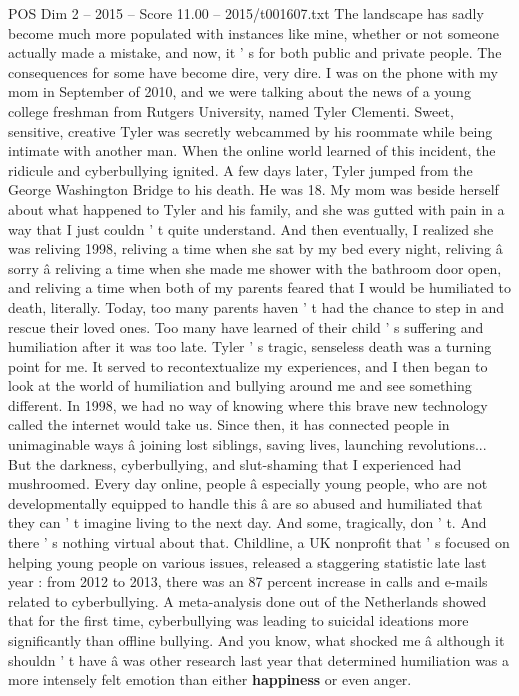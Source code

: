 \begin{textsample}{POS Dim 2 – 2015 – Score 11.00 – 2015/t001607.txt}
The landscape has sadly become much more populated with instances like mine, whether or not someone actually made a mistake, and now, it ' s for both public and private people.
The consequences for some have become dire, very dire.
I was on the phone with my mom in September of 2010, and we were talking about the news of a young college freshman from Rutgers University, named Tyler Clementi.
Sweet, sensitive, creative Tyler was secretly webcammed by his roommate while being intimate with another man.
When the online world learned of this incident, the ridicule and cyberbullying ignited.
A few days later, Tyler jumped from the George Washington Bridge to his death.
He was 18.
My mom was beside herself about what happened to Tyler and his family, and she was gutted with pain in a way that I just couldn ' t quite understand.
And then eventually, I realized she was reliving 1998, reliving a time when she sat by my bed every night, reliving â sorry â reliving a time when she made me shower with the bathroom door open, and reliving a time when both of my parents feared that I would be humiliated to death, literally.
Today, too many parents haven ' t had the chance to step in and rescue their loved ones.
Too many have learned of their child ' s suffering and humiliation after it was too late.
Tyler ' s tragic, senseless death was a turning point for me.
It served to recontextualize my experiences, and I then began to look at the world of humiliation and bullying around me and see something different.
In 1998, we had no way of knowing where this brave new technology called the internet would take us.
Since then, it has connected people in unimaginable ways â joining lost siblings, saving lives, launching revolutions...
But the darkness, cyberbullying, and slut-shaming that I experienced had mushroomed.
Every day online, people â especially young people, who are not developmentally equipped to handle this â are so abused and humiliated that they can ' t imagine living to the next day.
And some, tragically, don ' t.
And there ' s nothing virtual about that.
Childline, a UK nonprofit that ' s focused on helping young people on various issues, released a staggering statistic late last year : from 2012 to 2013, there was an 87 percent increase in calls and e-mails related to cyberbullying.
A meta-analysis done out of the Netherlands showed that for the first time, cyberbullying was leading to suicidal ideations more significantly than offline bullying.
And you know, what shocked me â although it shouldn ' t have â was other research last year that determined humiliation was a more intensely felt emotion than either \textbf{happiness} or even anger.

\end{textsample}
